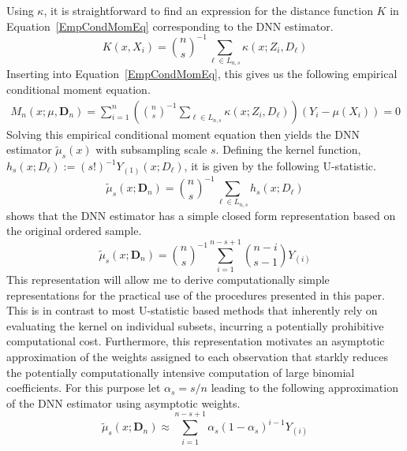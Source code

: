 Using $\kappa$, it is straightforward to find an expression for the distance function $K$ in Equation~\ref{EmpCondMomEq} corresponding to the DNN estimator.
\begin{equation}\label{eq:data_distance}
	K(x, X_{i})
	= \binom{n}{s}^{-1} \sum_{\ell \in L_{n,s}} \kappa(x; Z_{i}, D_{\ell})
\end{equation}
Inserting into Equation~\ref{EmpCondMomEq}, this gives us the following empirical conditional moment equation.
\begin{equation}
	\begin{aligned}
		M_n(x; \mu, \mathbf{D}_n)
		= \sum_{i = 1}^{n}\left(\binom{n}{s}^{-1} \sum_{\ell \in L_{n,s}} \kappa(x; Z_{i}, D_{\ell})\right)\left(Y_{i} - \mu(X_{i})\right)
		= 0
	\end{aligned}
\end{equation}
Solving this empirical conditional moment equation then yields the DNN estimator $\tilde{\mu}_{s}(x)$ with subsampling scale $s$.
Defining the kernel function, $h_{s}(x; D_{\ell}) := (s!)^{-1} Y_{(1)}(x; D_{\ell})$, it is given by the following U-statistic.
\begin{equation}\label{eq:U_stat}
	\tilde{\mu}_{s}(x; \mathbf{D}_n)
	= \binom{n}{s}^{-1} \sum_{\ell \in L_{n,s}} h_{s}(x; D_{\ell})
\end{equation}
\citet{steele_exact_2009} shows that the DNN estimator has a simple closed form representation based on the original ordered sample.
\begin{equation}\label{eq:DNN_closed_form}
	\tilde{\mu}_{s}(x; \mathbf{D}_n)
	= \binom{n}{s}^{-1} \sum_{i = 1}^{n - s + 1}\binom{n - i}{s - 1}Y_{(i)}
\end{equation}
This representation will allow me to derive computationally simple representations for the practical use of the procedures presented in this paper.
This is in contrast to most U-statistic based methods that inherently rely on evaluating the kernel on individual subsets, incurring a potentially prohibitive computational cost.
Furthermore, this representation motivates an asymptotic approximation of the weights assigned to each observation that starkly reduces the potentially computationally intensive computation of large binomial coefficients.
For this purpose let $\alpha_{s} = s/n$ leading to the following approximation of the DNN estimator using asymptotic weights.
\begin{equation}\label{eq:DNN_approx_closed_form}
	\tilde{\mu}_{s}(x; \mathbf{D}_n)
	\approx  \sum_{i = 1}^{n - s + 1} \alpha_{s} \left(1 - \alpha_{s}\right)^{i - 1} Y_{(i)}
\end{equation}
